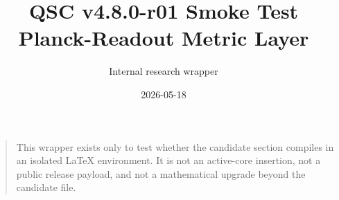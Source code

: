 \documentclass[11pt]{article}
\title{QSC v4.8.0-r01 Smoke Test\\Planck-Readout Metric Layer}
\author{Internal research wrapper}
\date{2026-05-18}
\theoremstyle{remark}
\begin{document}
\maketitle

\begin{quote}\small
This wrapper exists only to test whether the candidate section compiles in an
isolated LaTeX environment. It is not an active-core insertion, not a public
release payload, and not a mathematical upgrade beyond the candidate file.
\end{quote}


\end{document}
